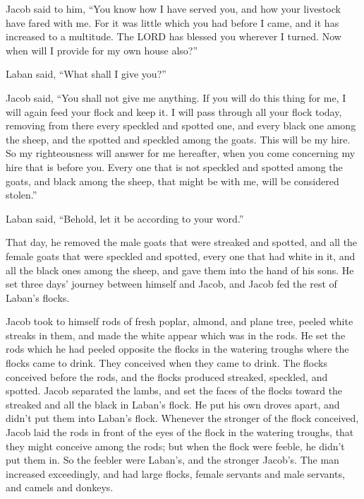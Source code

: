 \myverse{}Jacob said to him, “You know how I have served you, and how your livestock have fared with me.  \myverse{}For it was little which you had before I came, and it has increased to a multitude. The LORD has blessed you wherever I turned. Now when will I provide for my own house also?”

\myverse{}Laban said, “What shall I give you?”

Jacob said, “You shall not give me anything. If you will do this thing for me, I will again feed your flock and keep it.  \myverse{}I will pass through all your flock today, removing from there every speckled and spotted one, and every black one among the sheep, and the spotted and speckled among the goats. This will be my hire.  \myverse{}So my righteousness will answer for me hereafter, when you come concerning my hire that is before you. Every one that is not speckled and spotted among the goats, and black among the sheep, that might be with me, will be considered stolen.”

\myverse{}Laban said, “Behold, let it be according to your word.”

\myverse{}That day, he removed the male goats that were streaked and spotted, and all the female goats that were speckled and spotted, every one that had white in it, and all the black ones among the sheep, and gave them into the hand of his sons.  \myverse{}He set three days’ journey between himself and Jacob, and Jacob fed the rest of Laban’s flocks.

\myverse{}Jacob took to himself rods of fresh poplar, almond, and plane tree, peeled white streaks in them, and made the white appear which was in the rods.  \myverse{}He set the rods which he had peeled opposite the flocks in the watering troughs where the flocks came to drink. They conceived when they came to drink.  \myverse{}The flocks conceived before the rods, and the flocks produced streaked, speckled, and spotted.  \myverse{}Jacob separated the lambs, and set the faces of the flocks toward the streaked and all the black in Laban’s flock. He put his own droves apart, and didn’t put them into Laban’s flock.  \myverse{}Whenever the stronger of the flock conceived, Jacob laid the rods in front of the eyes of the flock in the watering troughs, that they might conceive among the rods;  \myverse{}but when the flock were feeble, he didn’t put them in. So the feebler were Laban’s, and the stronger Jacob’s.  \myverse{}The man increased exceedingly, and had large flocks, female servants and male servants, and camels and donkeys.

